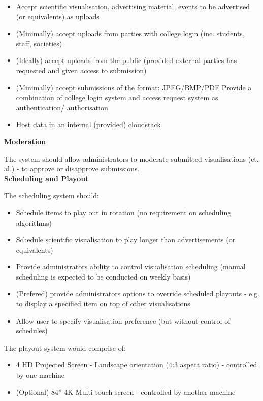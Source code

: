 \documentclass[a4paper, titlepage]{article}
\begin{document}
\begin{itemize}
\item Accept scientific visualisation, advertising material, events to be advertised (or equivalents) as uploads
\item (Minimally) accept uploads from parties with college login (inc. students, staff, societies)
\item (Ideally) accept uploads from the public (provided external parties has requested and given access to submission)
\item (Minimally) accept submissions of the format: JPEG/BMP/PDF Provide a combination of college login system and access request system as authentication/ authorisation
\item Host data in an internal (provided) cloudstack\\
\end{itemize}

\textbf{\large Moderation}

The system should allow administrators to moderate submitted visualisations (et. al.) - to approve or disapprove submissions.\\

\textbf{\large Scheduling and Playout}

The scheduling system should:

\begin{itemize}
\item Schedule items to play out in rotation (no requirement on scheduling algorithms)
\item Schedule scientific visualisation to play longer than advertisements (or equivalents)
\item Provide administrators ability to control visualisation scheduling (manual scheduling is expected to be conducted on weekly basis)
\item (Prefered) provide administrators options to override scheduled playouts - e.g. to display a specified item on top of other visualisations
\item Allow user to specify visualisation preference (but without control of schedules)
\end{itemize}

The playout system would comprise of:

\begin{itemize}
\item 4 HD Projected Screen - Landscape orientation (4:3 aspect ratio) - controlled by one machine 
\item (Optional) 84” 4K Multi-touch screen - controlled by another machine
\end{itemize}
\end{document}
